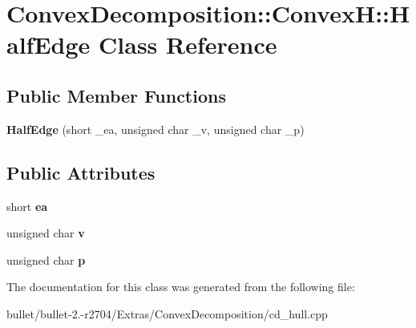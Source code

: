 \hypertarget{class_convex_decomposition_1_1_convex_h_1_1_half_edge}{\section{Convex\+Decomposition\+:\+:Convex\+H\+:\+:Half\+Edge Class Reference}
\label{class_convex_decomposition_1_1_convex_h_1_1_half_edge}
}
\subsection*{Public Member Functions}
\begin{DoxyCompactItemize}
\item 
\hypertarget{class_convex_decomposition_1_1_convex_h_1_1_half_edge_a4f48c921732ac28fb1cbdde3e5597e04}{{\bfseries Half\+Edge} (short \+\_\+ea, unsigned char \+\_\+v, unsigned char \+\_\+p)}\label{class_convex_decomposition_1_1_convex_h_1_1_half_edge_a4f48c921732ac28fb1cbdde3e5597e04}

\end{DoxyCompactItemize}
\subsection*{Public Attributes}
\begin{DoxyCompactItemize}
\item 
\hypertarget{class_convex_decomposition_1_1_convex_h_1_1_half_edge_ab50f2e780dfab9070ff0553187025aa3}{short {\bfseries ea}}\label{class_convex_decomposition_1_1_convex_h_1_1_half_edge_ab50f2e780dfab9070ff0553187025aa3}

\item 
\hypertarget{class_convex_decomposition_1_1_convex_h_1_1_half_edge_a89377462c74ea898cf9052b553b6e9d1}{unsigned char {\bfseries v}}\label{class_convex_decomposition_1_1_convex_h_1_1_half_edge_a89377462c74ea898cf9052b553b6e9d1}

\item 
\hypertarget{class_convex_decomposition_1_1_convex_h_1_1_half_edge_a9339106c0af7d0a0ae55afadd6dc1344}{unsigned char {\bfseries p}}\label{class_convex_decomposition_1_1_convex_h_1_1_half_edge_a9339106c0af7d0a0ae55afadd6dc1344}

\end{DoxyCompactItemize}


The documentation for this class was generated from the following file\+:\begin{DoxyCompactItemize}
\item 
bullet/bullet-\/2.-\/r2704/\+Extras/\+Convex\+Decomposition/cd\+\_\+hull.\+cpp\end{DoxyCompactItemize}

